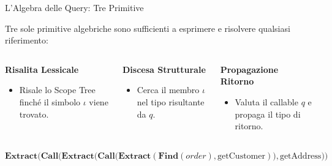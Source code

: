 \documentclass[aspectratio=169,10pt]{beamer}
\begin{document}
\begin{frame}{L'Algebra delle Query: Tre Primitive}
  \par\vspace{0.1em}
  Tre sole primitive algebriche sono sufficienti a esprimere e risolvere qualsiasi riferimento:
  \vspace{0.15em}

  \begin{columns}[T,onlytextwidth]
      \begin{cookiecard}[title={Primitiva Find}]
        \small \textbf{Risalita Lessicale}
        \begin{itemize}\setlength{\itemsep}{0.1em}
          \item Risale lo Scope Tree finché il simbolo $\iota$ viene trovato.
        \end{itemize}
      \end{cookiecard}

      \begin{cookiecard}[title={Primitiva Extract}]
        \small \textbf{Discesa Strutturale}
        \begin{itemize}\setlength{\itemsep}{0.1em}
          \item Cerca il membro $\iota$ nel tipo risultante da $q$.
        \end{itemize}
      \end{cookiecard}

      \begin{cookiecard}[title={Primitiva Call}]
        \small \textbf{Propagazione Ritorno}
        \begin{itemize}\setlength{\itemsep}{0.1em}
          \item Valuta il callable $q$ e propaga il tipo di ritorno.
        \end{itemize}
      \end{cookiecard}
  \end{columns}
  \vspace{0.2em}

  \begin{cookiecard}[title={Composizione Algebrica per Invocazioni Concatenate}]
    \centering\footnotesize
    $\mathbf{Extract}\Big(\mathbf{Call}\Big(\mathbf{Extract}\Big(\mathbf{Call}\Big(\mathbf{Extract}(\mathbf{Find}(order), \text{getCustomer})\Big), \text{getAddress}\Big)\Big)$
  \end{cookiecard}

\end{frame}
\end{document}
